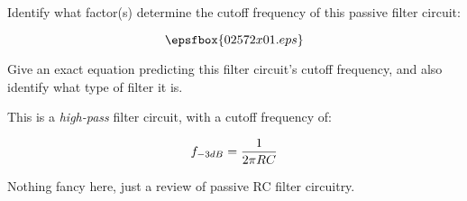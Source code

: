 

Identify what factor(s) determine the cutoff frequency of this passive filter circuit:

$$\epsfbox{02572x01.eps}$$

Give an exact equation predicting this filter circuit's cutoff frequency, and also identify what type of filter it is.







This is a {\it high-pass} filter circuit, with a cutoff frequency of:

$$f_{-3 dB} = {1 \over {2 \pi R C}}$$







Nothing fancy here, just a review of passive RC filter circuitry.




